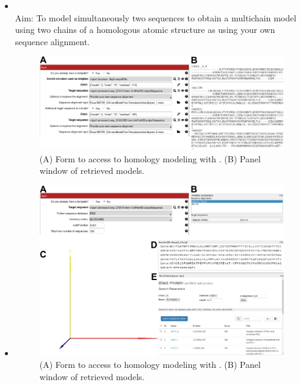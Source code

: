 \begin{itemize}
                \item {}\\
                Aim: To model simultaneously two  sequences to obtain a multichain model using two chains of a homologous atomic structure as  using your own sequence alignment.

 
                            \begin{figure}[H]
                            \centering 
                            \captionsetup{width=.9\linewidth} 
                            \includegraphics[width=.9\textwidth]{Images_appendix/Fig307.pdf}
                            \caption{(A) Form to access to homology modeling with \modeller. (B) Panel window of \modeller retrieved models.}
                            \label{fig:app_protocol_seqHomology_4}
                            \end{figure}
                            
                \item {}

 
                            \begin{figure}[H]
                            \centering 
                            \captionsetup{width=.9\linewidth} 
                            \includegraphics[width=.9\textwidth]{Images_appendix/Fig308.pdf}
                            \caption{(A) Form to access to homology modeling with \modeller. (B) Panel window of \modeller retrieved models.}
                            \label{fig:app_protocol_seqHomology_5}
                            \end{figure}
                            
\end{itemize}

